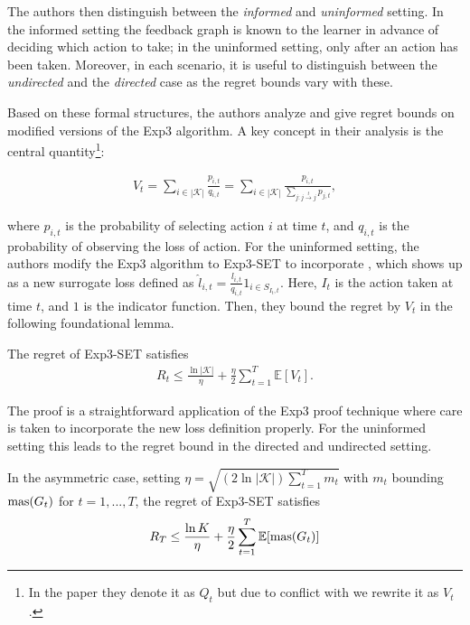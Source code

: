 The authors then distinguish between the \textit{informed} and \textit{uninformed} setting. In the informed setting the feedback graph is known to the learner in advance of deciding which action to take; in the uninformed setting, only after an action has been taken. Moreover, in each scenario, it is useful to distinguish between the \textit{undirected} and the \textit{directed} case as the regret bounds vary with these. 

Based on these formal structures, the authors analyze and give regret bounds on modified versions of the Exp3 algorithm. A key concept in their analysis is the central quantity\footnote{In the paper they denote it as $Q_t$ but due to conflict with \citep{hazan} we rewrite it as $V_t$.}:

\begin{align}\label{alon:foundation}
	V_t=\sum_{i\in |\mathcal{K}|}\frac{p_{i,t}}{q_{i,t}} = \sum_{i\in |\mathcal{K}|}\frac{p_{i,t}}{\sum_{j:j\overset{t}{\to}j} p_{j,t}},
\end{align}

where $p_{i,t}$ is the probability of selecting action $i$ at time $t$, and $q_{i,t}$ is the probability of observing the loss of action. For the uninformed setting, the authors modify the Exp3 algorithm to Exp3-SET to incorporate \label{alon:foundation}, which shows up as a new surrogate loss defined as $\hat{l}_{i,t}=\frac{l_{i,t}}{q_{i,t}}1_{i\in S_{I_t,t}}$. Here, $I_t$ is the action taken at time $t$, and $1$ is the indicator function. Then, they bound the regret by $V_t$ in the following foundational lemma.

\begin{lemma}
	The regret of Exp3-SET satisfies
	\begin{align}
		R_t\leq \frac{\ln |\mathcal{K}|}{\eta} + \frac{\eta}{2}\sum_{t=1}^T\mathbb{E}[V_t].
	\end{align}
\end{lemma}

The proof is a straightforward application of the Exp3 proof technique where care is taken to incorporate the new loss definition properly. For the uninformed setting this leads to the regret bound in the directed and undirected setting.

\begin{theorem} \label{alon:undirected}
	In the asymmetric case, setting $\eta=\sqrt{(2\ln |\mathcal{K}|)\sum_{t=1}^Tm_t}$ with $m_t$ bounding $\text{\normalfont mas}(G_t)$ for $t=1,...,T$, the regret of Exp3-SET satisfies 
	\begin{align}
		R_T\leq \frac{\ln K}{\eta} +\frac{\eta}{2}\sum_{t=1}^T\mathbb{E}[\text{\normalfont mas}(G_t)]
	\end{align}
\end{theorem} 

